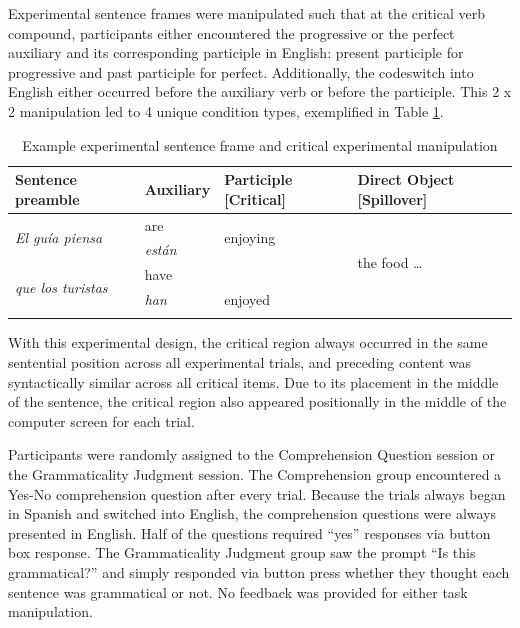 \documentclass[output=paper,colorlinks,citecolor=brown]{langscibook}
\begin{document}
Experimental sentence frames were manipulated such that at the critical verb compound, participants either encountered the progressive or the perfect auxiliary and its corresponding participle in English: present participle for progressive and past participle for perfect. Additionally, the codeswitch into English either occurred before the auxiliary verb or before the participle. This 2 x 2 manipulation led to 4 unique condition types, exemplified in Table \ref{tab:myname:example}.

\begin{table}
\caption{Example experimental sentence frame and critical experimental manipulation}
\label{tab:myname:example}
 \begin{tabularx}{0.8\textwidth}{XXXX}
  \lsptoprule
    Sentence preamble & Auxiliary & Participle [Critical] & Direct Object [Spillover]\\
  \midrule
 \multirow{2}{*}{\textit{El gu\'ia piensa}} & are & \multirow{2}{*}{enjoying} & \multirow{4}{*}{the food \ldots}\\
  & \textit{est\'an} & & \\
 \multirow{2}{*}{\textit{que los turistas}} & have & &\\
 & \textit{han} & enjoyed &\\
  \lspbottomrule
 \end{tabularx}
\end{table}
With this experimental design, the critical region always occurred in the same sentential position across all experimental trials, and preceding content was syntactically similar across all critical items. Due to its placement in the middle of the sentence, the critical region also appeared positionally in the middle of the computer screen for each trial.

Participants were randomly assigned to the Comprehension Question session or the Grammaticality Judgment session. The Comprehension group encountered a Yes-No comprehension question after every trial. Because the trials always began in Spanish and switched into English, the comprehension questions were always presented in English. Half of the questions required ``yes'' responses via button box response. The Grammaticality Judgment group saw the prompt ``Is this grammatical?'' and simply responded via button press whether they thought each sentence was grammatical or not. No feedback was provided for either task manipulation.
\end{document}
